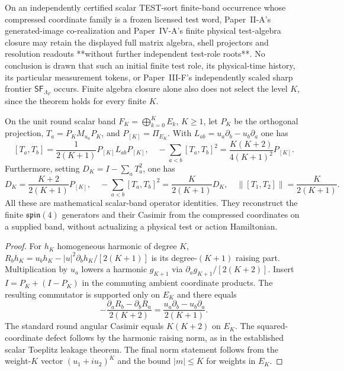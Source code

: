\documentclass[12pt,a4paper]{article}
\begin{document}
\begin{remark}
\label{p2c:rem:finite-coordinate-algebra-occurrence-boundary}
On an independently certified scalar TEST-sort finite-band occurrence
whose compressed coordinate family is a frozen licensed test word,
Paper~II-A's generated-image co-realization and Paper~IV-A's finite
physical test-algebra closure may retain the displayed full matrix
algebra, shell projectors and resolution readouts **without further
independent test-role roots**. No conclusion is drawn that such an
initial finite test role, its physical-time history, its particular
measurement tokens, or Paper~III-F's independently scaled sharp
frontier $\mathsf{SF}_{\Lambda_F}$ occurs. Finite algebra closure
alone also does not select the level $K$, since the theorem holds for
every finite $K$.
\end{remark}

\begin{theorem}
\label{p2c:thm:research-v13-scalar-boundary-commutator}
On the unit round scalar band $F_K=\bigoplus_{k=0}^KE_k$,
$K\ge1$, let $P_K$ be the orthogonal projection,
$T_a=P_KM_{u_a}P_K$, and $P_{[K]}=\Pi_{E_K}$.
With $L_{ab}=u_a\partial_b-u_b\partial_a$ one has
\[
 [T_a,T_b]=\frac1{2(K+1)}P_{[K]}L_{ab}P_{[K]},
 \quad
 -\sum_{a<b}[T_a,T_b]^2
  =\frac{K(K+2)}{4(K+1)^2}P_{[K]}.
\]
Furthermore, setting $D_K=I-\sum_aT_a^2$, one has
\[
 D_K=\frac{K+2}{2(K+1)}P_{[K]},
 \quad
 -\sum_{a<b}[T_a,T_b]^2=\frac{K}{2(K+1)}D_K,
 \quad
 \|[T_1,T_2]\|=\frac{K}{2(K+1)}.
\]
All these are mathematical scalar-band operator identities. They
reconstruct the finite $\mathfrak{spin}(4)$ generators and their
Casimir from the compressed coordinates on a supplied band, without
actualizing a physical test or action Hamiltonian.
\end{theorem}
\begin{proof}
For $h_K$ homogeneous harmonic of degree $K$,
$R_bh_K=u_bh_K-|u|^2\partial_bh_K/[2(K+1)]$
is its degree-$(K+1)$ raising part. Multiplication by $u_a$
lowers a harmonic $g_{K+1}$ via $\partial_ag_{K+1}/[2(K+2)]$.
Insert $I=P_K+(I-P_K)$ in the commuting ambient coordinate
products. The resulting commutator is supported only on $E_K$ and
there equals
\[
 -\frac{\partial_aR_b-\partial_bR_a}{2(K+2)}
 =\frac{u_a\partial_b-u_b\partial_a}{2(K+1)}.
\]
The standard round angular Casimir equals $K(K+2)$ on $E_K$.
The squared-coordinate defect follows by the harmonic raising norm,
as in the established scalar Toeplitz leakage theorem. The final
norm statement follows from the weight-$K$ vector
$(u_1+iu_2)^K$ and the bound $|m|\le K$ for weights in $E_K$.
\end{proof}
\end{document}
